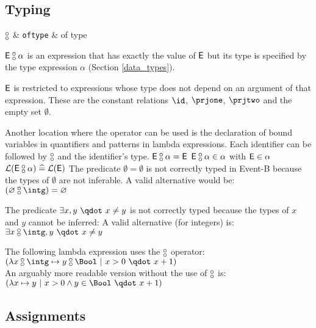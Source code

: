 \begin{samepage}
\subsection{Typing}
\label{typing}
\begin{rrnames}
  $\boftype$      & \texttt{oftype}   & of type
\end{rrnames}
\begin{rodinrefentry}
  \rrdesc
    $\expre\boftype \alpha$ is an expression that has exactly the value of $\textsf{E}$ but its
    type is specified by the type expression $\alpha$ (Section \ref{data_types}).

    $\mathsf{\textsf{E}}$ is restricted to expressions whose type does not depend on an argument of that expression.
    These are the constant relations $\id$, $\prjone$, $\prjtwo$ and the empty set $\emptyset$.

    Another location where the operator can be used is the declaration of bound variables 
    in quantifiers and patterns in lambda expressions.
    Each identifier can be followed by $\boftype$ and the identifier's type.
  \rrdef
    $\expre\boftype\alpha = \expre$
  \rrtypes
    $\expre\boftype\alpha\in\alpha$ with $\textsf{E}\in\alpha$
  \rrwd
    $\wdl(\expre\boftype\alpha) \defi \wdl(\expre)$
  \rrex
    The predicate $\emptyset=\emptyset$ is not correctly typed in Event-B because the types
    of $\emptyset$ are not inferable. A valid alternative would be:\\
    $(\emptyset\boftype\intg) = \emptyset$

    The predicate $\exists x,y ~\qdot~ x\neq y$ is not correctly typed because the types of $x$ and $y$
    cannot be inferred: A valid alternative (for integers) is:\\
    $\exists x\boftype\intg,y ~\qdot~ x\neq y$

    The following lambda expression uses the $\boftype$ operator:\\
    $(\lambda x\boftype \intg\mapsto y\boftype\Bool ~|~ x>0 ~\qdot~ x+1)$\\
    An arguably more readable version without the use of $\boftype$ is:\\
    $(\lambda x\mapsto y ~|~ x>0 \land y\in\Bool ~\qdot~ x+1)$
\end{rodinrefentry}
\end{samepage}


\subsection{Assignments}
\label{assignments}

